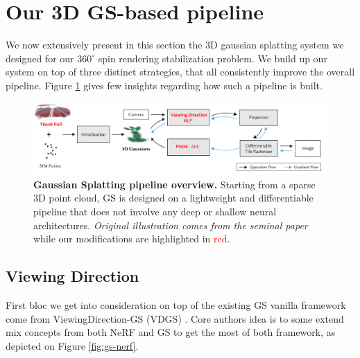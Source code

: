 \section{Our 3D GS-based pipeline}
We now extensively present in this section the 3D gaussian splatting system we designed for our $360^{\circ}$ spin rendering stabilization problem. We build up our system on top of three distinct strategies, that all consistently improve the overall pipeline. Figure \ref{fig:gs-overview} gives few insights regarding how such a pipeline is built. \newline

\begin{figure}[htb!]
    \center
  \includegraphics[width=\linewidth]{images/gaussiansplatting/overview_pipeline.png}
  \caption{\textbf{Gaussian Splatting pipeline overview.} Starting from a sparse 3D point cloud, GS is designed on a lightweight and differentiable pipeline that does not involve any deep or shallow neural architectures. \textit{Original illustration comes from the seminal paper}\citep{kerbl20233d} while our modifications are highlighted in \textcolor{red}{red}.}
  \label{fig:gs-overview}
\end{figure}

\subsection{Viewing Direction}
First bloc we get into consideration on top of the existing GS vanilla framework come from ViewingDirection-GS (VDGS) \citep{malarz2023gaussian}. Core authors idea is to some extend mix concepts from both NeRF and GS to get the most of both framework, as depicted on Figure \ref{fig:gs-nerf}. 

